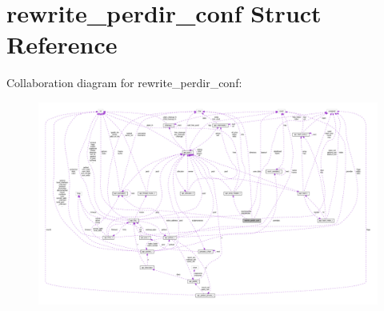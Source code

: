 \hypertarget{structrewrite__perdir__conf}{}\section{rewrite\+\_\+perdir\+\_\+conf Struct Reference}
\label{structrewrite__perdir__conf}


Collaboration diagram for rewrite\+\_\+perdir\+\_\+conf\+:
\nopagebreak
\begin{figure}[H]
\begin{center}
\leavevmode
\includegraphics[width=350pt]{structrewrite__perdir__conf__coll__graph}
\end{center}
\end{figure}
